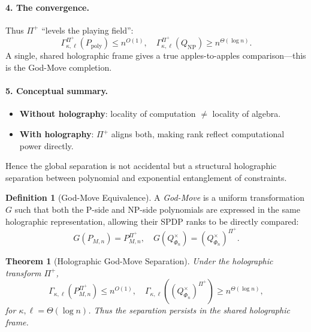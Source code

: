 \documentclass[12pt]{article}
\newtheorem{theorem}{Theorem}
\theoremstyle{definition}
\newtheorem{definition}{Definition}
\theoremstyle{definition}
\theoremstyle{remark}
\theoremstyle{remark}
\begin{document}
\paragraph{4. The convergence.}
Thus $\Pi^+$ ``levels the playing field'':
\[
\Gamma_{\kappa,\ell}^{\Pi^+}(P_{\mathrm{poly}}) \leq n^{O(1)}, \quad \Gamma_{\kappa,\ell}^{\Pi^+}(Q_{\mathrm{NP}}) \geq n^{\Theta(\log n)}.
\]
A single, shared holographic frame gives a true apples-to-apples comparison---this is the God-Move completion.

\paragraph{5. Conceptual summary.}
\begin{itemize}
\item \textbf{Without holography}: locality of computation $\neq$ locality of algebra.
\item \textbf{With holography}: $\Pi^+$ aligns both, making rank reflect computational power directly.
\end{itemize}
Hence the global separation is not accidental but a structural holographic separation between polynomial and exponential entanglement of constraints.

\begin{definition}[God-Move Equivalence]\label{def:god-move-equivalence}
A \emph{God-Move} is a uniform transformation $G$ such that both the P-side and NP-side polynomials are expressed in the same holographic representation, allowing their SPDP ranks to be directly compared:
\[
G(P_{M,n}) = P_{M,n}^{\Pi^+}, \quad G(Q^{\times}_{\Phi_n}) = (Q^{\times}_{\Phi_n})^{\Pi^+}.
\]
\end{definition}

\begin{theorem}[Holographic God-Move Separation]\label{thm:holo-godmove}
Under the holographic transform $\Pi^+$,
\[
\Gamma_{\kappa,\ell}(P_{M,n}^{\Pi^+}) \leq n^{O(1)}, \quad \Gamma_{\kappa,\ell}((Q^{\times}_{\Phi_n})^{\Pi^+}) \geq n^{\Theta(\log n)},
\]
for $\kappa, \ell = \Theta(\log n)$. Thus the separation persists in the shared holographic frame.
\end{theorem}
\end{document}
